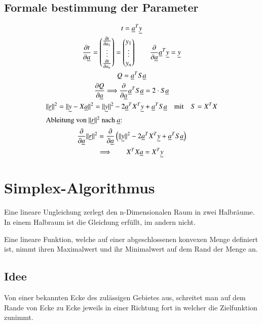 \subsection{Formale bestimmung der Parameter}
\begin{gather}
  t = \underline{a}^T\underline{y} \\
  \frac{\partial t}{\partial \underline{a}} =
	\begin{pmatrix}
		\frac{\partial t}{\partial a_1} \\ \vdots \\ \frac{\partial t}{\partial a_n}
	\end{pmatrix} = \begin{pmatrix} y_1 \\ \vdots \\ y_n \end{pmatrix} \qquad
	\frac{\partial}{\partial\underline{a}}\underline{a}^T\underline{y} = \underline{y} \\
  Q = \underline{a}^TS\underline{a} \\
  \frac{\partial Q}{\partial\underline{a}} \Longrightarrow
	\frac{\partial}{\partial\underline{a}}\underline{a}^TS\underline{a} = 2\cdot S\underline{a} \\
  \|\underline{r}\|^2 = \|\underline{y} - X\underline{a}\|^2 = \|\underline{y}\|^2 -
	2\underline{a}^TX^T\underline{y}+\underline{a}^TS\underline{a} \quad\text{mit}\quad S=X^TX \\
  \intertext{Ableitung von $\|\underline{r}\|^2$ nach $\underline{a}$:}
  \frac{\partial}{\partial\underline{a}}\|\underline{r}\|^2 =
	\frac{\partial}{\partial\underline{a}}
	\left({\|\underline{y}\|^2 - 2\underline{a}^TX^T\underline{y} + \underline{a}^TS\underline{a}}\right) \\
  \Longrightarrow\qquad X^TX\underline{a} = X^T\underline{y}
\end{gather}


\section{Simplex-Algorithmus}
Eine lineare Ungleichung zerlegt den n-Dimensionalen Raum in zwei Halbr\"aume. In einem Halbraum ist die Gleichung erf\"ullt, im andern nicht.

Eine lineare Funktion, welche auf einer abgeschlossenen konvexen Menge definiert ist, nimmt ihren Maximalwert und ihr Minimalwert auf dem Rand der Menge an.

\subsection{Idee}
Von einer bekannten Ecke des zul\"assigen Gebietes aus, schreitet man auf dem Rande von Ecke zu Ecke jeweils in einer Richtung fort in welcher die Zielfunktion zunimmt.

